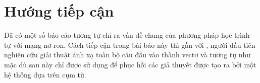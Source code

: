 \section{Hướng tiếp cận}

Đã có một số báo cáo tương tự chỉ ra vấn đề chung của phương pháp học trình tự với mạng nơ-ron. Cách tiếp cận trong bài báo này thì gần với \citep{kalchbrenner2013recurrent}, người đầu tiên nghiên cứu giải thuật ánh xạ toàn bộ câu đầu vào thành vectơ và tương tự như \citep{cho2014learning} mặc dù sau này chỉ được sử dụng để phục hồi các giả thuyết được tạo ra bởi một hệ thống dựa trên cụm từ. 